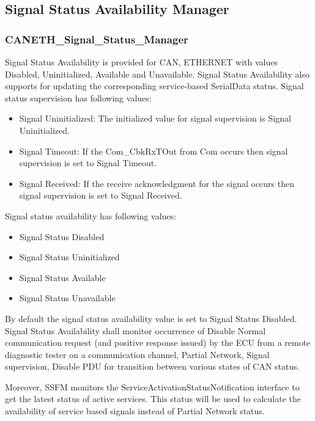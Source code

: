\subsection{Signal Status Availability Manager}
\subsubsection{CANETH_Signal_Status_Manager}
\label{subsec:Signal_avail_status}

Signal Status Availability is provided for CAN, ETHERNET with values Disabled, Uninitialized, Available
and Unavailable. Signal Status Availability also supports for updating the corresponding service-based SerialData status.
Signal status supervision has following values:
\begin{itemize}
    \item Signal Uninitialized: The initialized value for signal supervision is Signal Uninitialized.
    \item Signal Timeout: If the Com_CbkRxTOut from Com occurs then signal supervision is set to Signal Timeout.
    \item Signal Received: If the receive acknowledgment for the signal occurs then signal supervision is set to Signal Received.
\end{itemize}
Signal status availability has following values:
\begin{itemize}
    \item Signal Status Disabled
    \item Signal Status Uninitialized
    \item Signal Status Available
    \item Signal Status Unavailable
\end{itemize}
By default the signal status availability value is set to Signal Status Disabled.
Signal Status Availability shall monitor occurrence of Disable Normal communication request (and positive response issued) by the ECU from a remote diagnostic tester on a communication channel, Partial Network, Signal supervision, Disable PDU for transition between various states of CAN status.

{      }


Moreover, SSFM monitors the ServiceActivationStatusNotification interface to get the latest status of active services. This status will be used to calculate the availability of 
service based signals instead of Partial Network status.


